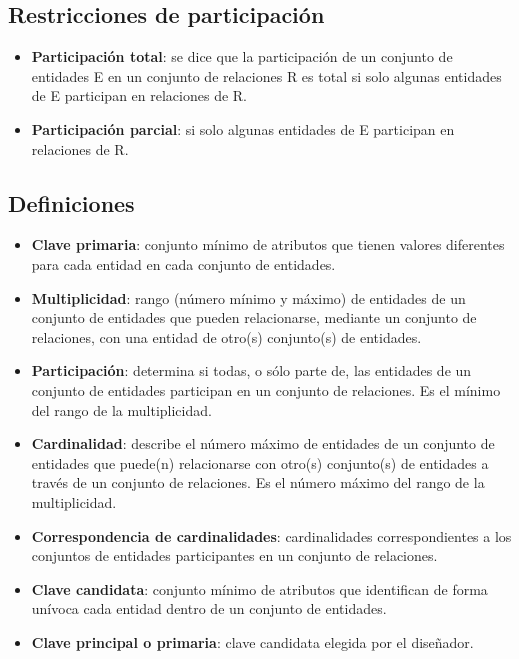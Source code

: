 \documentclass{article}
\begin{document}
\subsection{Restricciones de participación}
\begin{itemize}
    \item \textbf{Participación total}: se dice que la participación de un conjunto de entidades E en un conjunto de relaciones R es total si solo algunas entidades de E participan en relaciones de R.

    \item \textbf{Participación parcial}: si solo algunas entidades de E participan en relaciones de R.
\end{itemize}

\subsection{Definiciones}
\begin{itemize}
    \item \textbf{Clave primaria}: conjunto mínimo de atributos que tienen valores diferentes para cada entidad en cada conjunto de entidades.

    \item \textbf{Multiplicidad}: rango (número mínimo y máximo) de entidades de un conjunto de entidades que pueden relacionarse, mediante un conjunto de relaciones, con una entidad de otro(s) conjunto(s) de entidades.

    \item \textbf{Participación}: determina si todas, o sólo parte de, las entidades de un conjunto de entidades participan en un conjunto de relaciones. Es el mínimo del rango de la multiplicidad.

    \item \textbf{Cardinalidad}: describe el número máximo de entidades de un conjunto de entidades que puede(n) relacionarse con otro(s) conjunto(s) de entidades a través de un conjunto de relaciones. Es el número máximo del rango de la multiplicidad.

    \item \textbf{Correspondencia de cardinalidades}: cardinalidades correspondientes a los conjuntos de entidades participantes en un conjunto de relaciones.

    \item \textbf{Clave candidata}: conjunto mínimo de atributos que identifican de forma unívoca cada entidad dentro de un conjunto de entidades.

    \item \textbf{Clave principal o primaria}: clave candidata elegida por el diseñador.
\end{itemize}
\end{document}

